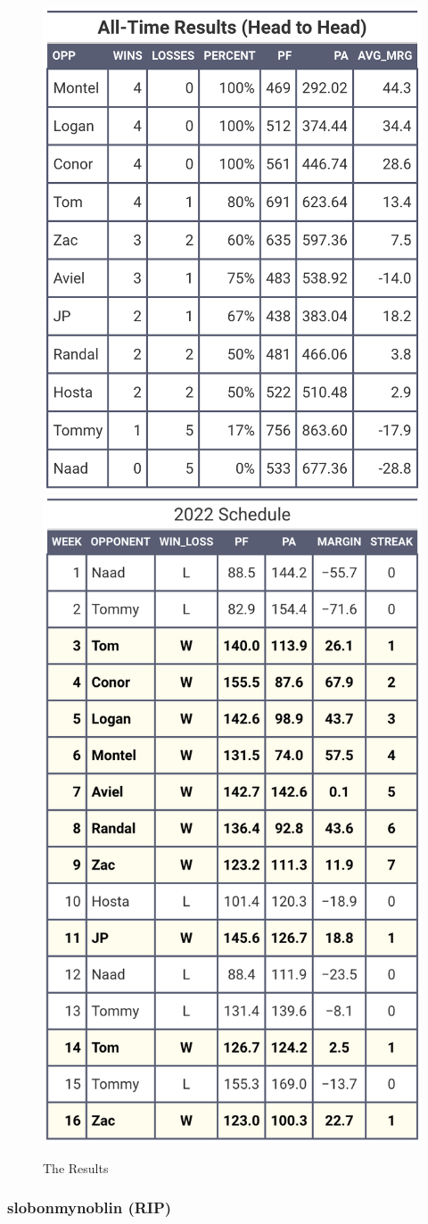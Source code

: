 \documentclass[
]{article}
\begin{document}
\begin{figure}
\includegraphics[width=0.5\linewidth,height=0.5\textheight]{output/headtohead/Patrick_head_to_head} \includegraphics[width=0.5\linewidth,height=0.5\textheight]{output/py_schedule/season_results_Patrick} \caption{The Results}\label{fig:unnamed-chunk-37}
\end{figure}

\hypertarget{slobonmynoblin-rip}{%
\subsubsection{slobonmynoblin (RIP)}\label{slobonmynoblin-rip}}
\end{document}

